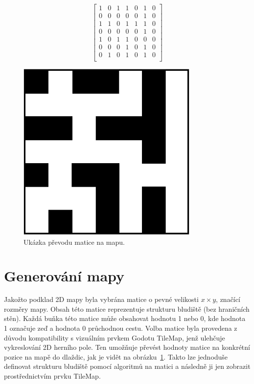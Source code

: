 \begin{figure}[ht]
    \centering
    \begin{minipage}[c]{0.48\textwidth}
        \centering
        \[
        \begin{bmatrix}
            1 & 0 & 1 & 1 & 0 & 1 & 0 \\
            0 & 0 & 0 & 0 & 0 & 1 & 0 \\
            1 & 1 & 0 & 1 & 1 & 1 & 0 \\
            0 & 0 & 0 & 0 & 0 & 1 & 0 \\
            1 & 0 & 1 & 1 & 0 & 0 & 0 \\
            0 & 0 & 0 & 1 & 0 & 1 & 0 \\
            0 & 1 & 0 & 1 & 0 & 1 & 0 \\
        \end{bmatrix}
        \]
    \end{minipage}
    \begin{minipage}[c]{0.48\textwidth}
        \centering
        \includegraphics[width=0.8\textwidth]{obrazky-figures/ch4/matrix_to_maze.pdf}
    \end{minipage}
    \caption{Ukázka převodu matice na mapu.}
    \label{fig:matrix_to_maze}
\end{figure}
\vspace{1.3cm}

\section{Generování mapy}
Jakožto podklad 2D mapy byla vybrána matice o pevné velikosti $x \times y$, značící rozměry mapy. Obsah této matice reprezentuje strukturu bludiště (bez hraničních stěn). Každá buňka této matice může obsahovat hodnotu 1 nebo 0, kde hodnota 1 označuje zeď a hodnota 0 průchodnou cestu. Volba matice byla provedena z důvodu kompatibility s vizuálním prvkem Godotu TileMap, jenž ulehčuje vykreslování 2D herního pole. Ten umožňuje převést hodnoty matice na konkrétní pozice na mapě do dlaždic, jak je vidět na obrázku~\ref{fig:matrix_to_maze}. Takto lze jednoduše definovat strukturu bludiště pomocí algoritmů na matici a následně ji jen zobrazit prostřednictvím prvku TileMap.

